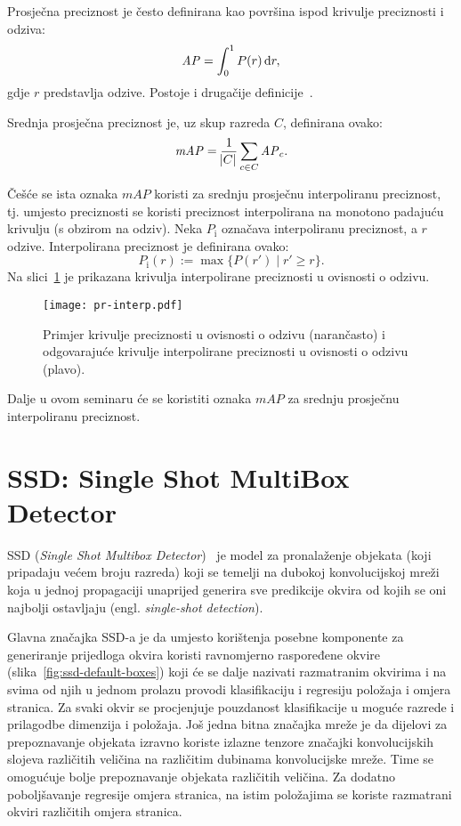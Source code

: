 \documentclass[utf8, diplomski, numeric, lmodern]{fer}
\begin{document}
Prosječna preciznost je često definirana kao površina ispod krivulje preciznosti i odziva:
\begin{equation} \label{eq:AP}
\mathit{AP} = \int_{0}^{1} P(r) \dif r,
\end{equation}
gdje $r$ predstavlja odzive. Postoje i drugačije definicije~\cite{wiki-ir}.

Srednja prosječna preciznost je, uz skup razreda $C$, definirana ovako:
\begin{equation} \label{eq:mAP}
\mathit{mAP} = \frac{1}{\abs C}\sum_{c \in C} \mathit{AP}_c .
\end{equation}

Češće se ista oznaka $\mathit{mAP}$ koristi za srednju prosječnu interpoliranu preciznost, tj. umjesto preciznosti se koristi preciznost interpolirana na monotono padajuću krivulju (s obzirom na odziv). Neka $P_\mathrm{i}$ označava interpoliranu preciznost, a $r$ odzive. Interpolirana preciznost je definirana ovako:
\begin{equation} \label{eq:Pi}
P_\mathrm{i}(r) := \max\{P(r') \mid r' \geq r \}.
\end{equation}
Na slici~\ref{fig:pr-interp} je prikazana krivulja interpolirane preciznosti u ovisnosti o odzivu.

\begin{figure}[htbp] \centering
	\texttt{[image: pr-interp.pdf]}
	\caption{Primjer krivulje preciznosti u ovisnosti o odzivu (narančasto) i odgovarajuće krivulje interpolirane preciznosti u ovisnosti o odzivu (plavo).}
	\label{fig:pr-interp}
\end{figure}

Dalje u ovom seminaru će se koristiti oznaka $\mathit{mAP}$ za srednju prosječnu interpoliranu preciznost.



\chapter{SSD: Single Shot MultiBox Detector} \label{chap:ssd}

SSD (\emph{Single Shot Multibox Detector})~\cite{ssd} je model za pronalaženje objekata (koji pripadaju većem broju razreda) koji se temelji na dubokoj konvolucijskoj mreži koja u jednoj propagaciji unaprijed generira sve predikcije okvira od kojih se oni najbolji ostavljaju (engl. \emph{single-shot detection}). 

Glavna značajka SSD-a je da umjesto korištenja posebne komponente za generiranje prijedloga okvira koristi ravnomjerno raspoređene okvire (slika~\ref{fig:ssd-default-boxes}) koji će se dalje nazivati razmatranim okvirima i na svima od njih u jednom prolazu provodi klasifikaciju i regresiju položaja i omjera stranica. Za svaki okvir se procjenjuje pouzdanost klasifikacije u moguće razrede i prilagodbe dimenzija i položaja. Još jedna bitna značajka mreže je da dijelovi za prepoznavanje objekata izravno koriste izlazne tenzore značajki konvolucijskih slojeva različitih veličina na različitim dubinama konvolucijske mreže. Time se omogućuje bolje prepoznavanje objekata različitih veličina. Za dodatno poboljšavanje regresije omjera stranica, na istim položajima se koriste razmatrani okviri različitih omjera stranica.
\end{document}
